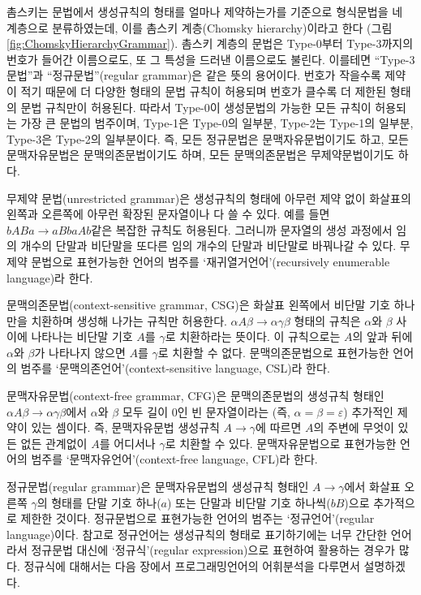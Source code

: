 \documentclass[b5paper,chapter,figtabcapt]{oblivoir}
\begin{document}
\noindent
촘스키는 문법에서 생성규칙의 형태를 얼마나 제약하는가를 기준으로 형식문법을
네 계층으로 분류하였는데\cite{Chomsky56}, 이를 촘스키 계층(Chomsky hierarchy)이라고
한다 (그림\;\ref{fig:ChomskyHierarchyGrammar}).
촘스키 계층의 문법은 Type-0부터 Type-3까지의 번호가 들어간 이름으로도,
또 그 특성을 드러낸 이름으로도 불린다. 이를테면 ``Type-3 문법''과
``정규문법''(regular grammar)은 같은 뜻의 용어이다. 번호가 작을수록
제약이 적기 때문에 더 다양한 형태의 문법 규칙이 허용되며 번호가 클수록
더 제한된 형태의 문법 규칙만이 허용된다. 따라서 Type-0이 생성문법의
가능한 모든 규칙이 허용되는 가장 큰 문법의 범주이며, Type-1은 Type-0의 일부분,
Type-2는 Type-1의 일부분, Type-3은 Type-2의 일부분이다. 즉,
모든 정규문법은 문맥자유문법이기도 하고, 모든 문맥자유문법은 문맥의존문법이기도 하며,
모든 문맥의존문법은 무제약문법이기도 하다.

무제약 문법(unrestricted grammar)은 생성규칙의 형태에 아무런 제약 없이
화살표의 왼쪽과 오른쪽에 아무런 확장된 문자열이나 다 쓸 수 있다. 예를 들면
$bABa \to aBbaAb$같은 복잡한 규칙도 허용된다. 그러니까 문자열의 생성 과정에서
임의 개수의 단말과 비단말을 또다른 임의 개수의 단말과 비단말로 바꿔나갈 수 있다.
무제약 문법으로 표현가능한 언어의 범주를
`재귀열거언어'(recursively enumerable language)라 한다.

문맥의존문법(context-sensitive grammar, CSG)은 화살표 왼쪽에서 비단말 기호 하나만을
치환하며 생성해 나가는 규칙만 허용한다. $\alpha A\beta\to\alpha\gamma\beta$ 형태의
규칙은 $\alpha$와 $\beta$ 사이에 나타나는 비단말 기호 $A$를 $\gamma$로 치환하라는 뜻이다.
이 규칙으로는 $A$의 앞과 뒤에 $\alpha$와 $\beta$가 나타나지 않으면
$A$를 $\gamma$로 치환할 수 없다. 문맥의존문법으로 표현가능한 언어의 범주를
`문맥의존언어'(context-sensitive language, CSL)라 한다.

문맥자유문법(context-free grammar, CFG)은 문맥의존문법의 생성규칙 형태인
$\alpha A\beta\to\alpha\gamma\beta$에서 $\alpha$와 $\beta$ 모두 길이 0인
빈 문자열이라는 (즉, $\alpha=\beta=\varepsilon$) 추가적인 제약이 있는 셈이다.
즉, 문맥자유문법 생성규칙 $A\to\gamma$에 따르면 $A$의 주변에 무엇이 있든 없든
관계없이 $A$를 어디서나 $\gamma$로 치환할 수 있다. 문맥자유문법으로 표현가능한
언어의 범주를 `문맥자유언어'(context-free language, CFL)라 한다.

정규문법(regular grammar)은 문맥자유문법의 생성규칙 형태인 $A\to\gamma$에서
화살표 오른쪽 $\gamma$의 형태를 단말 기호 하나($a$) 또는
단말과 비단말 기호 하나씩($bB$)으로 추가적으로 제한한 것이다.
정규문법으로 표현가능한 언어의 범주는 `정규언어'(regular language)이다. 
참고로 정규언어는 생성규칙의 형태로 표기하기에는 너무 간단한 언어라서
정규문법 대신에 `정규식'(regular expression)으로 표현하여 활용하는 경우가 많다.
정규식에 대해서는 다음 장에서 프로그래밍언어의 어휘분석을 다루면서 설명하겠다.
\end{document}
